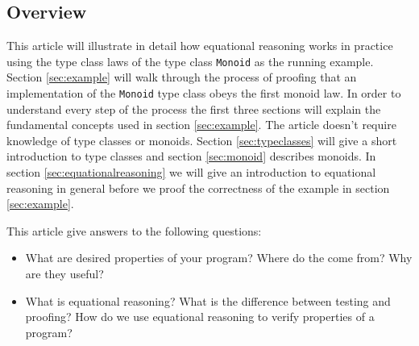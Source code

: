 \subsection{Overview}

This article will illustrate in detail how equational reasoning works in practice using the type class laws of the type class \verb|Monoid| as the running example. Section \ref{sec:example} will walk through the process of proofing that an implementation of the \verb|Monoid| type class obeys the first monoid law.  In order to understand every step of the process the first three sections will explain the fundamental concepts used in section \ref{sec:example}. The article doesn't require knowledge of type classes or \glspl{monoid}. 
Section \ref{sec:typeclasses} will give a short introduction to type classes and section \ref{sec:monoid} describes monoids. In section \ref{sec:equationalreasoning} we will give an introduction to equational reasoning in general before we proof the correctness of the example in section \ref{sec:example}.

This article give answers to the following questions:
\begin{itemize}
\item What are desired properties of your program? Where do the come from? Why are they useful?
\item What is equational reasoning? What is the difference between testing and proofing? How do we use equational reasoning to verify properties of a program?
\end{itemize}

